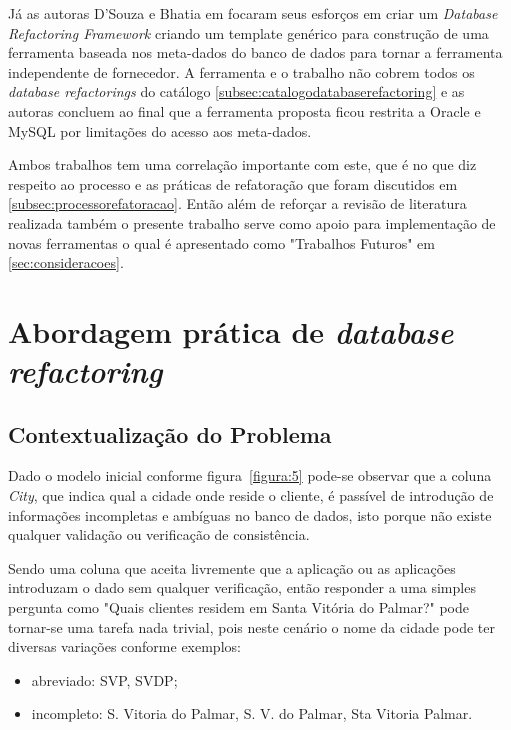 \documentclass[10pt]{article}
\begin{document}
    Já as autoras D'Souza e Bhatia em \cite{SousaAndBhatia:RefactoringOfADatabase} focaram seus esforços em criar um \textit{Database Refactoring Framework} criando um template genérico para construção de uma ferramenta baseada nos meta-dados do banco de dados para tornar a ferramenta independente de fornecedor. A ferramenta e o trabalho não cobrem todos os \textit{database refactorings} do catálogo \ref{subsec:catalogodatabaserefactoring} e as autoras concluem ao final que a ferramenta proposta ficou restrita a Oracle e MySQL por limitações do acesso aos meta-dados.
    
    Ambos trabalhos tem uma correlação importante com este, que é no que diz respeito ao processo e as práticas de refatoração que foram discutidos em \ref{subsec:processorefatoracao}. Então além de reforçar a revisão de literatura realizada também o presente trabalho serve como apoio para implementação de novas ferramentas o qual é apresentado como "Trabalhos Futuros" em \ref{sec:consideracoes}.

\section{Abordagem prática de \textit{database refactoring}}\label{sec:exemplo}
    
\subsection{Contextualização do Problema}
    Dado o modelo inicial conforme figura~\ref{figura:5} pode-se observar que a coluna \textit{City}, que indica qual a cidade onde reside o cliente, é passível de introdução de informações incompletas e ambíguas no banco de dados, isto porque não existe qualquer validação ou verificação de consistência.
    
    Sendo uma coluna que aceita livremente que a aplicação ou as aplicações introduzam o dado sem qualquer verificação, então responder a uma simples pergunta como "Quais clientes residem em Santa Vitória do Palmar?" pode tornar-se uma tarefa nada trivial, pois neste cenário o nome da cidade pode ter diversas variações conforme exemplos:
    \begin{itemize}
        \item abreviado: SVP, SVDP;
        \item incompleto: S. Vitoria do Palmar, S. V. do Palmar, Sta Vitoria Palmar.
    \end{itemize}
    
\end{document}
